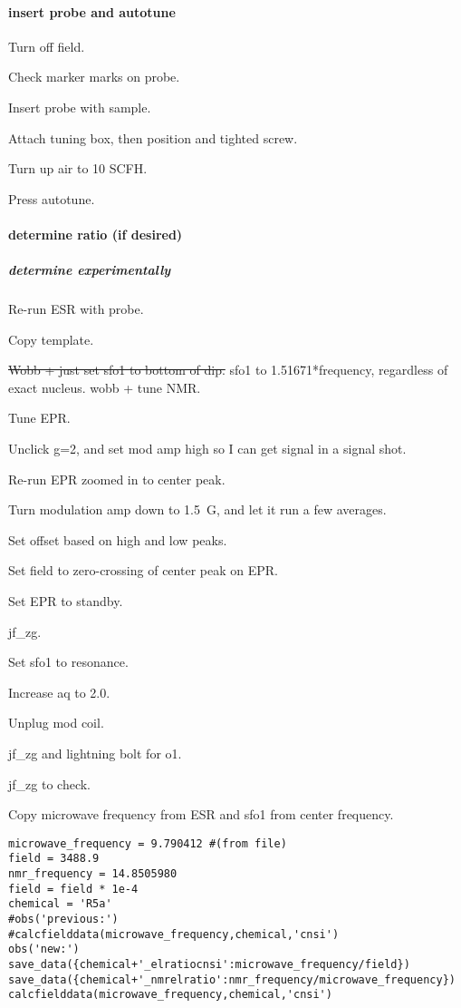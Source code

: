 \paragraph{insert probe and autotune}

Turn off field.

Check marker marks on probe.

Insert probe with sample.

Attach tuning box, then position and tighted screw.

Turn up air to 10 SCFH.

Press autotune.

\paragraph{determine ratio (if desired)}

\subparagraph{determine experimentally}
Re-run ESR with probe.

Copy template.

\sout{ Wobb + just set sfo1 to bottom of dip. }
sfo1 to 1.51671*frequency, regardless of exact nucleus.
wobb + tune NMR.

Tune EPR.

Unclick g=2, and set mod amp high so I can get signal in a signal shot.

Re-run EPR zoomed in to center peak.

Turn modulation amp down to 1.5~G, and let it run a few averages.

Set offset based on high and low peaks.

Set field to zero-crossing of center peak on EPR.

Set EPR to standby.

jf\_zg.

Set sfo1 to resonance.

Increase aq to 2.0.  

Unplug mod coil.

jf\_zg and lightning bolt for o1.  

jf\_zg to check.

Copy microwave frequency from ESR and sfo1 from center frequency.  


\begin{lstlisting}
microwave_frequency = 9.790412 #(from file)
field = 3488.9
nmr_frequency = 14.8505980
field = field * 1e-4
chemical = 'R5a'
#obs('previous:')
#calcfielddata(microwave_frequency,chemical,'cnsi')
obs('new:')
save_data({chemical+'_elratiocnsi':microwave_frequency/field})
save_data({chemical+'_nmrelratio':nmr_frequency/microwave_frequency})
calcfielddata(microwave_frequency,chemical,'cnsi')
\end{lstlisting}

